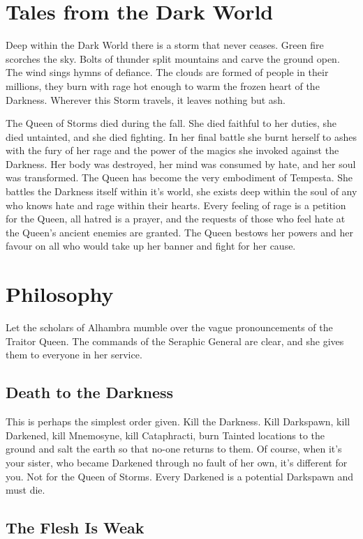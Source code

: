 \section*{Tales from the Dark World}

Deep within the Dark World there is a storm that never ceases. Green fire scorches the sky. Bolts of thunder split mountains and carve the ground open. The wind sings hymns of defiance. The clouds are formed of people in their millions, they burn with rage hot enough to warm the frozen heart of the Darkness. Wherever this Storm travels, it leaves nothing but ash. 

The Queen of Storms died during the fall. She died faithful to her duties, she died untainted, and she died fighting. In her final battle she burnt herself to ashes with the fury of her rage and the power of the magics she invoked against the Darkness. Her body was destroyed, her mind was consumed by hate, and her soul was transformed. The Queen has become the very embodiment of Tempesta. She battles the Darkness itself within it's world, she exists deep within the soul of any who knows hate and rage within their hearts. Every feeling of rage is a petition for the Queen, all hatred is a prayer, and the requests of those who feel hate at the Queen's ancient enemies are granted. The Queen bestows her powers and her favour on all who would take up her banner and fight for her cause. 

\section*{Philosophy}

Let the scholars of Alhambra mumble over the vague pronouncements of the Traitor Queen. The commands of the Seraphic General are clear, and she gives them to everyone in her service. 
\subsection*{Death to the Darkness}

This is perhaps the simplest order given. Kill the Darkness. Kill Darkspawn, kill Darkened, kill Mnemosyne, kill Cataphracti, burn Tainted locations to the ground and salt the earth so that no-one returns to them. Of course, when it's your sister, who became Darkened through no fault of her own, it's different for you. Not for the Queen of Storms. Every Darkened is a potential Darkspawn and must die. 

\subsection*{The Flesh Is Weak}

